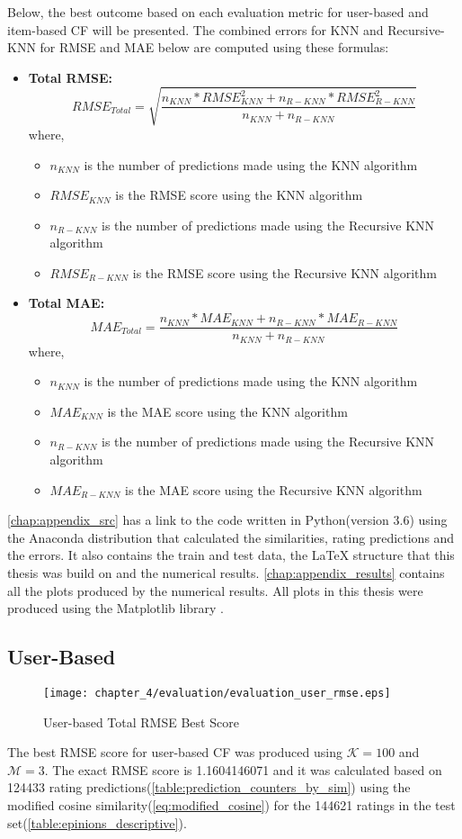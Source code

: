 Below, the best outcome based on each evaluation metric for user-based and
item-based CF will be presented. The combined errors for KNN and Recursive-KNN
for RMSE and MAE below are computed using these formulas:
\begin{itemize}
	\item[] \textbf{Total RMSE:}
	$$RMSE_{Total} = \sqrt{\frac{n_{KNN}*RMSE_{KNN}^2 + n_{R-KNN}*RMSE_{R-KNN}^2}{n_{KNN} + n_{R-KNN}}}$$
	where,
	\begin{itemize}
		\item[] $n_{KNN}$ is the number of predictions made using the KNN algorithm
		\item[] $RMSE_{KNN}$ is the RMSE score using the KNN algorithm
		\item[] $n_{R-KNN}$ is the number of predictions made using the Recursive KNN algorithm
		\item[] $RMSE_{R-KNN}$ is the RMSE score using the Recursive KNN algorithm
	\end{itemize}
	\item[] \textbf{Total MAE:}
	$$MAE_{Total} = \frac{n_{KNN}*MAE_{KNN} + n_{R-KNN}*MAE_{R-KNN}}{n_{KNN} + n_{R-KNN}}$$
	where,
	\begin{itemize}
		\item[] $n_{KNN}$ is the number of predictions made using the KNN algorithm
		\item[] $MAE_{KNN}$ is the MAE score using the KNN algorithm
		\item[] $n_{R-KNN}$ is the number of predictions made using the Recursive KNN algorithm
		\item[] $MAE_{R-KNN}$ is the MAE score using the Recursive KNN algorithm
	\end{itemize}
\end{itemize}

\autoref{chap:appendix_src} has a link to
the code written in Python(version 3.6) using the Anaconda distribution \citep{anaconda}
that calculated the similarities, rating predictions
and the errors. It also contains the train and test data, the \LaTeX{} structure
that this thesis was build on and the numerical results.
\autoref{chap:appendix_results} contains all the plots produced by the
numerical results. All plots in this thesis were produced using the Matplotlib library
\citep{Hunter:2007}.

\subsection{User-Based}
\begin{figure}[H]
\centering
\texttt{[image: chapter\_4/evaluation/evaluation\_user\_rmse.eps]}
\caption{User-based Total RMSE Best Score}
\label{figure:user_best_total_rmse}
\end{figure}
The best RMSE score for user-based CF was produced using $\mathcal{K}=100$ and $\mathcal{M}=3$.
The exact RMSE score is 1.1604146071 and it was calculated based on 124433 rating predictions(\autoref{table:prediction_counters_by_sim})
using the modified cosine similarity(\autoref{eq:modified_cosine})
for the 144621 ratings in the test set(\autoref{table:epinions_descriptive}).

